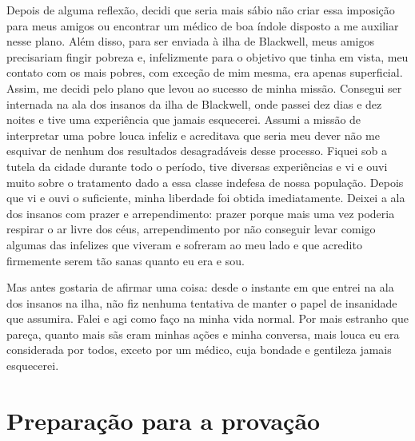 
Depois
de alguma reflexão, decidi que seria mais sábio não criar essa imposição
para meus amigos ou encontrar um médico de boa índole disposto a me
auxiliar nesse plano. Além disso, para ser enviada à ilha de Blackwell,
meus amigos precisariam fingir pobreza e, infelizmente para o objetivo
que tinha em vista, meu contato com os mais pobres, com exceção de mim
mesma, era apenas superficial. Assim, me decidi pelo plano que levou ao
sucesso de minha missão. Consegui ser internada na ala dos insanos da
ilha de Blackwell, onde passei dez dias e dez noites e tive uma
experiência que jamais esquecerei. Assumi a missão de interpretar uma
pobre louca infeliz e acreditava que seria meu dever não me esquivar de
nenhum dos resultados desagradáveis desse processo. Fiquei sob a tutela
da cidade durante todo o período, tive diversas experiências e vi e ouvi
muito sobre o tratamento dado a essa classe indefesa de nossa população.
Depois que vi e ouvi o suficiente, minha liberdade foi obtida
imediatamente. Deixei a ala dos insanos com prazer e arrependimento:
prazer porque mais uma vez poderia respirar o ar livre dos céus,
arrependimento por não conseguir levar comigo algumas das infelizes que
viveram e sofreram ao meu lado e que acredito firmemente serem tão sanas
quanto eu era e sou.

Mas antes gostaria de afirmar uma coisa: desde o instante em que entrei
na ala dos insanos na ilha, não fiz nenhuma tentativa de manter o papel
de insanidade que assumira. Falei e agi como faço na minha vida normal.
Por mais estranho que pareça, quanto mais sãs eram minhas ações e minha
conversa, mais louca eu era considerada por todos, exceto por um médico,
cuja bondade e gentileza jamais esquecerei.


\chapter{Preparação para a
provação}\label{capuxedtulo-ii-preparauxe7uxe3o-para-a-provauxe7uxe3o}

